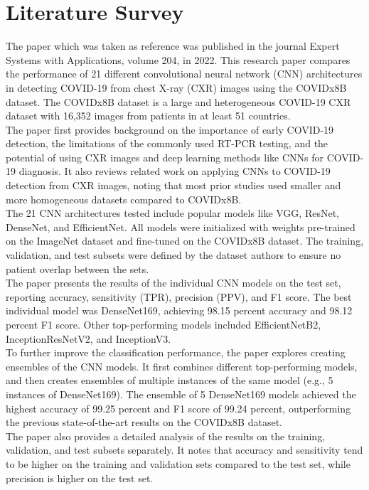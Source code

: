 \documentclass[12pt, a4paper]{report}
\begin{document}
\chapter{Literature Survey}
The paper which was taken as reference was published in the journal Expert Systems with Applications, volume 204, in 2022. This research paper compares the performance of 21 different convolutional neural network (CNN) architectures in detecting COVID-19 from chest X-ray (CXR) images using the COVIDx8B dataset. The COVIDx8B dataset is a large and heterogeneous COVID-19 CXR dataset with 16,352 images from patients in at least 51 countries.\\

The paper first provides background on the importance of early COVID-19 detection, the limitations of the commonly used RT-PCR testing, and the potential of using CXR images and deep learning methods like CNNs for COVID-19 diagnosis. It also reviews related work on applying CNNs to COVID-19 detection from CXR images, noting that most prior studies used smaller and more homogeneous datasets compared to COVIDx8B.\\

The 21 CNN architectures tested include popular models like VGG, ResNet, DenseNet, and EfficientNet. All models were initialized with weights pre-trained on the ImageNet dataset and fine-tuned on the COVIDx8B dataset. The training, validation, and test subsets were defined by the dataset authors to ensure no patient overlap between the sets.\\

The paper presents the results of the individual CNN models on the test set, reporting accuracy, sensitivity (TPR), precision (PPV), and F1 score. The best individual model was DenseNet169, achieving 98.15 percent accuracy and 98.12 percent F1 score. Other top-performing models included EfficientNetB2, InceptionResNetV2, and InceptionV3.\\

To further improve the classification performance, the paper explores creating ensembles of the CNN models. It first combines different top-performing models, and then creates ensembles of multiple instances of the same model (e.g., 5 instances of DenseNet169). The ensemble of 5 DenseNet169 models achieved the highest accuracy of 99.25 percent and F1 score of 99.24 percent, outperforming the previous state-of-the-art results on the COVIDx8B dataset.\\

The paper also provides a detailed analysis of the results on the training, validation, and test subsets separately. It notes that accuracy and sensitivity tend to be higher on the training and validation sets compared to the test set, while precision is higher on the test set.\\
\end{document}
